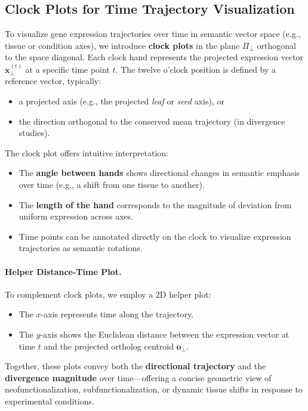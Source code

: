 \documentclass[11pt,a4paper]{article}
\begin{document}
\subsection{Clock Plots for Time Trajectory Visualization}

To visualize gene expression trajectories over time in semantic vector space (e.g., tissue or condition axes), we introduce \textbf{clock plots} in the plane $\Pi_{\perp}$ orthogonal to the space diagonal. Each clock hand represents the projected expression vector $\mathbf{x}_{\perp}^{(t)}$ at a specific time point $t$. The twelve o’clock position is defined by a reference vector, typically:
\begin{itemize}
  \item a projected axis (e.g., the projected \textit{leaf} or \textit{seed} axis), or
  \item the direction orthogonal to the conserved mean trajectory (in divergence studies).
\end{itemize}

The clock plot offers intuitive interpretation:
\begin{itemize}
  \item The \textbf{angle between hands} shows directional changes in semantic emphasis over time (e.g., a shift from one tissue to another).
  \item The \textbf{length of the hand} corresponds to the magnitude of deviation from uniform expression across axes.
  \item Time points can be annotated directly on the clock to visualize expression trajectories as semantic rotations.
\end{itemize}

\paragraph{Helper Distance-Time Plot.}
To complement clock plots, we employ a 2D helper plot:
\begin{itemize}
  \item The $x$-axis represents time along the trajectory.
  \item The $y$-axis shows the Euclidean distance between the expression vector at time $t$ and the projected ortholog centroid $\mathbf{o}_{\perp}$.
\end{itemize}

Together, these plots convey both the \textbf{directional trajectory} and the \textbf{divergence magnitude} over time—offering a concise geometric view of neofunctionalization, subfunctionalization, or dynamic tissue shifts in response to experimental conditions.
\end{document}

